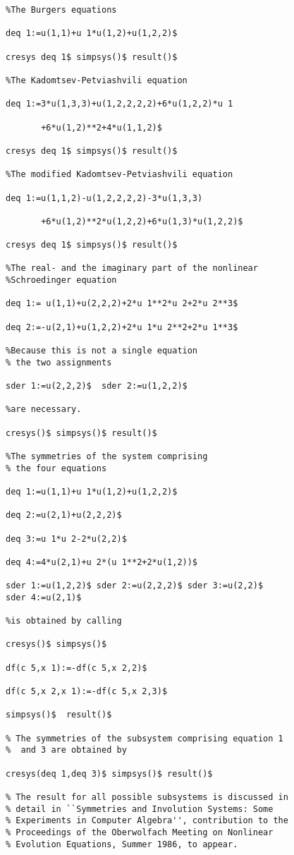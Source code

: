 \begin{verbatim}
%The Burgers equations

deq 1:=u(1,1)+u 1*u(1,2)+u(1,2,2)$

cresys deq 1$ simpsys()$ result()$

%The Kadomtsev-Petviashvili equation

deq 1:=3*u(1,3,3)+u(1,2,2,2,2)+6*u(1,2,2)*u 1

       +6*u(1,2)**2+4*u(1,1,2)$

cresys deq 1$ simpsys()$ result()$

%The modified Kadomtsev-Petviashvili equation

deq 1:=u(1,1,2)-u(1,2,2,2,2)-3*u(1,3,3)

       +6*u(1,2)**2*u(1,2,2)+6*u(1,3)*u(1,2,2)$

cresys deq 1$ simpsys()$ result()$

%The real- and the imaginary part of the nonlinear
%Schroedinger equation

deq 1:= u(1,1)+u(2,2,2)+2*u 1**2*u 2+2*u 2**3$

deq 2:=-u(2,1)+u(1,2,2)+2*u 1*u 2**2+2*u 1**3$

%Because this is not a single equation
% the two assignments

sder 1:=u(2,2,2)$  sder 2:=u(1,2,2)$

%are necessary.

cresys()$ simpsys()$ result()$

%The symmetries of the system comprising
% the four equations

deq 1:=u(1,1)+u 1*u(1,2)+u(1,2,2)$

deq 2:=u(2,1)+u(2,2,2)$

deq 3:=u 1*u 2-2*u(2,2)$

deq 4:=4*u(2,1)+u 2*(u 1**2+2*u(1,2))$

sder 1:=u(1,2,2)$ sder 2:=u(2,2,2)$ sder 3:=u(2,2)$
sder 4:=u(2,1)$

%is obtained by calling

cresys()$ simpsys()$

df(c 5,x 1):=-df(c 5,x 2,2)$

df(c 5,x 2,x 1):=-df(c 5,x 2,3)$

simpsys()$  result()$

% The symmetries of the subsystem comprising equation 1
%  and 3 are obtained by

cresys(deq 1,deq 3)$ simpsys()$ result()$

% The result for all possible subsystems is discussed in
% detail in ``Symmetries and Involution Systems: Some
% Experiments in Computer Algebra'', contribution to the
% Proceedings of the Oberwolfach Meeting on Nonlinear
% Evolution Equations, Summer 1986, to appear.
\end{verbatim}
